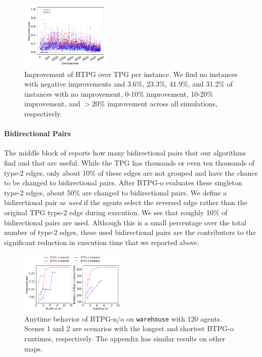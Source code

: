\documentclass[letterpaper]{article}
\theoremstyle{definition}
\begin{document}
\begin{figure}[t!]
\centering
\includegraphics[width=0.39\textwidth]{Figs/scatter.png}
\caption{Improvement of BTPG over TPG per instance. We find no instances with negative improvements and 3.6\%, 23.3\%,  41.9\%, and 31.2\% of instances with no improvement, 0-10\% improvement, 10-20\% improvement, and $>$20\% improvement across all simulations, respectively.}
\label{fig:scatter plot}
\end{figure}

\paragraph{Bidirectional Pairs} The middle block of  reports how many bidirectional pairs that our algorithms find and that are useful. While the TPG has thousands or even ten thousands of type-2 edges, only about 10\% of these edges are not grouped and have the chance to be changed to bidirectional pairs. After BTPG-o evaluates these singleton type-2 edges, about 50\% are changed to bidirectional pairs. We define a bidirectional pair as \emph{used} if the agents select the reversed edge rather than the original TPG type-2 edge during execution. We see that roughly 10\% of bidirectional pairs are used. Although this is a small percentage over the total number of type-2 edges, these used bidirectional pairs are the contributors to the significant reduction in execution time that we reported above.




\begin{figure}[t!]
\centering
\includegraphics[width=0.45\textwidth]{Figs/anytime_warehouse.png}
\caption{Anytime behavior of BTPG-n/o on \texttt{warehouse} with 120 agents. Scenes 1 and 2 are scenarios with the longest and shortest BTPG-o runtimes, respectively. The appendix has similar results on other maps.}
\label{fig:anytime}
\end{figure}
\end{document}
